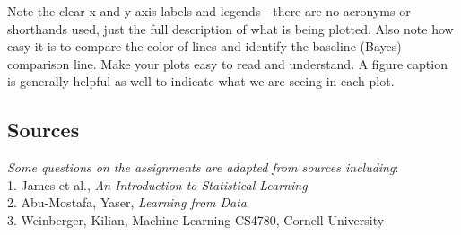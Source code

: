 \documentclass[
  letterpaper,
  DIV=11,
  numbers=noendperiod]{scrartcl}
\begin{document}
Note the clear x and y axis labels and legends - there are no acronyms
or shorthands used, just the full description of what is being plotted.
Also note how easy it is to compare the color of lines and identify the
baseline (Bayes) comparison line. Make your plots easy to read and
understand. A figure caption is generally helpful as well to indicate
what we are seeing in each plot.

\subsection{Sources}\label{sources}

\emph{Some questions on the assignments are adapted from sources
including}:\\
1. James et al., \emph{An Introduction to Statistical Learning}\\
2. Abu-Mostafa, Yaser, \emph{Learning from Data}\\
3. Weinberger, Kilian, Machine Learning CS4780, Cornell University
\end{document}
